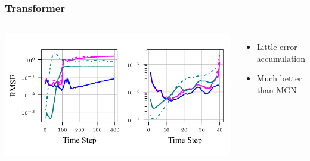 \documentclass{beamer}
\begin{document}
\begin{frame}
    \frametitle{Transformer}
\begin{columns}
\includegraphics[scale=0.2]{figures/Transformer_error.png}
\begin{itemize}
    \item Little error accumulation
    \item Much better than MGN
\end{itemize}
\end{columns}
\end{frame}
\end{document}
